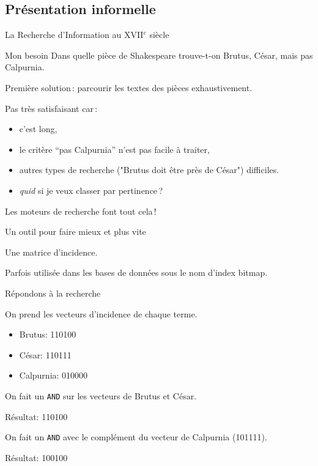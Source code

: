 \subsection{Présentation informelle}


\begin{frame}{La Recherche d'Information au XVII$^e$ siècle}

\begin{block}{Mon besoin}
Dans quelle pièce de Shakespeare trouve-t-on Brutus, César, mais pas Calpurnia.
\end{block}
\vfill

Première solution\,: parcourir les textes des pièces exhaustivement.

\vfill

Pas très satisfaisant car\,:
\begin{itemize}
  \item c'est long,
  \item le critère ``pas Calpurnia'' n'est pas facile à traiter,
  \item autres types de recherche ("Brutus doit être \alert{près de} César") difficiles.
  \item \textit{quid} si je veux \alert{classer} par pertinence\,?
\end{itemize}

Les moteurs de recherche font tout cela\,!

\end{frame}

\begin{frame}{Un outil pour faire mieux et plus vite}

Une \alert{matrice d'incidence}.


\medskip

Parfois utilisée dans les bases de données sous le nom \alert{d'index bitmap}.
\end{frame}


\begin{frame}{Répondons à la recherche}

On prend les \alert{vecteurs d'incidence} de chaque terme.

\begin{itemize}
  \item Brutus:       110100
  \item César:        110111
  \item Calpurnia:    010000
\end{itemize}

On fait un \texttt{AND} sur les vecteurs de Brutus et César.

\vfill
\centerline{Résultat: 110100}
\vfill

On fait un \texttt{AND} avec le \alert{complément} du vecteur de Calpurnia (101111).

\vfill
\centerline{Résultat: 100100}

\end{frame}


